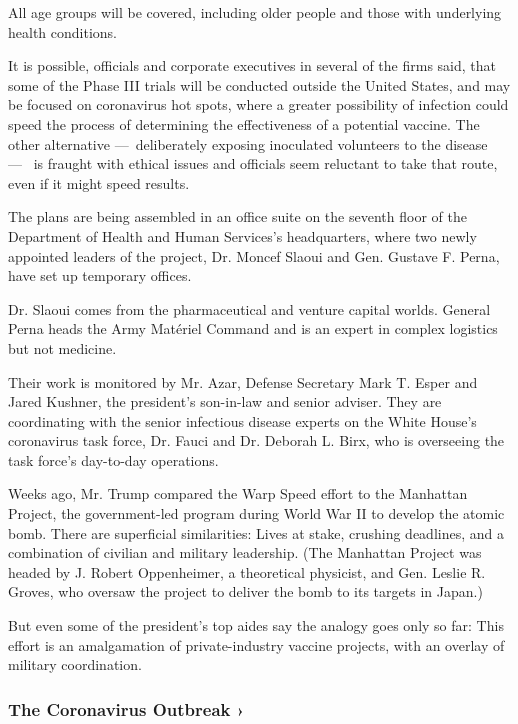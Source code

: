 All age groups will be covered, including older people and those with
underlying health conditions.

It is possible, officials and corporate executives in several of the
firms said, that some of the Phase III trials will be conducted outside
the United States, and may be focused on coronavirus hot spots, where a
greater possibility of infection could speed the process of determining
the effectiveness of a potential vaccine. The other alternative
---~deliberately exposing inoculated volunteers to the disease ---~ is
fraught with ethical issues and officials seem reluctant to take that
route, even if it might speed results.

The plans are being assembled in an office suite on the seventh floor of
the Department of Health and Human Services's headquarters, where two
newly appointed leaders of the project, Dr. Moncef Slaoui and Gen.
Gustave F. Perna, have set up temporary offices.

Dr. Slaoui comes from the pharmaceutical and venture capital worlds.
General Perna heads the Army Matériel Command and is an expert in
complex logistics but not medicine.

Their work is monitored by Mr. Azar, Defense Secretary Mark T. Esper and
Jared Kushner, the president's son-in-law and senior adviser. They are
coordinating with the senior infectious disease experts on the White
House's coronavirus task force, Dr. Fauci and Dr. Deborah L. Birx, who
is overseeing the task force's day-to-day operations.

Weeks ago, Mr. Trump compared the Warp Speed effort to the Manhattan
Project, the government-led program during World War II to develop the
atomic bomb. There are superficial similarities: Lives at stake,
crushing deadlines, and a combination of civilian and military
leadership. (The Manhattan Project was headed by J. Robert Oppenheimer,
a theoretical physicist, and Gen. Leslie R. Groves, who oversaw the
project to deliver the bomb to its targets in Japan.)

But even some of the president's top aides say the analogy goes only so
far: This effort is an amalgamation of private-industry vaccine
projects, with an overlay of military coordination.

\href{https://www.nytimes.com/news-event/coronavirus?action=click\&pgtype=Article\&state=default\&region=MAIN_CONTENT_3\&context=storylines_faq}{}

\hypertarget{the-coronavirus-outbreak-}{%
\subsubsection{The Coronavirus Outbreak
›}\label{the-coronavirus-outbreak-}}

